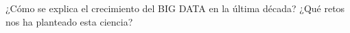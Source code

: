 \documentclass[reqno,twoside, 12pt]{report}
\begin{document}
%
\begin{thebibliography}{99}
	 ¿Cómo se explica el crecimiento del BIG DATA en la última década? ¿Qué retos nos ha planteado esta ciencia?


\end{thebibliography}
\end{document}
